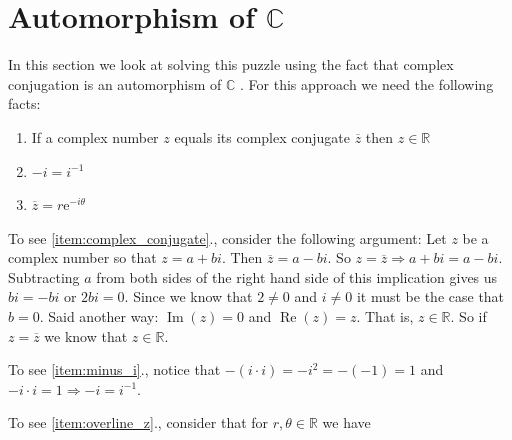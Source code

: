 \documentclass{article}
\theoremstyle{definition}
\begin{document}
\section{Automorphism of $\mathbb{C}$}
\label{sec:automorphism}
In this section we look at solving this puzzle using the fact
that complex conjugation is an automorphism of $\mathbb{C}$
\cite{complex_conjugation_is_automorphism}. For this approach we
need the following facts:

\begin{enumerate}
\item If a complex number $z$ equals its complex
conjugate $\overline{z}$ then $z \in \mathbb{R}$
\label{item:complex_conjugate}

\item $-i = i^{-1}$
\label{item:minus_i}

\item $\overline{z} = r \mathrm{e}^{-i\theta}$
\label{item:overline_z}
\end{enumerate}


\noindent
To see \ref{item:complex_conjugate}., consider the following
argument: Let $z$ be a complex number so that $z = a+bi$. Then
$\overline{z} = a-bi$. So $z = \overline{z} \Rightarrow a+bi =
a-bi$. Subtracting $a$ from both sides of the right hand side of
this implication gives us $bi = -bi$ or $2bi = 0$. Since we know
that $2 \neq 0$ and $i \neq 0$ it must be the case that
$b=0$. Said another way: $\operatorname{Im}(z) = 0$ and
$\operatorname{Re}(z) = z$. That is, $z \in \mathbb{R}$. So if $z
= \overline{z}$ we know that $z \in \mathbb{R}$.

\bigskip
\noindent
To see \ref{item:minus_i}., notice that $-(i\cdot i) = -i^2 =
-(-1) = 1$ and $-i \cdot i = 1 \Rightarrow -i = i^{-1}$.

\bigskip
\noindent
To see \ref{item:overline_z}., consider that for $r,\theta \in \mathbb{R}$ 
we have
\end{document}
